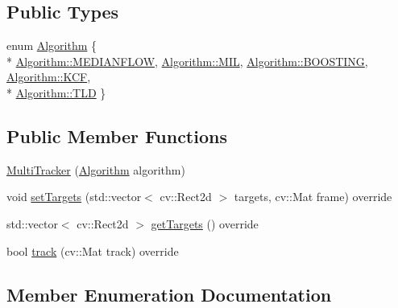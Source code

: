 \subsection*{Public Types}
\begin{DoxyCompactItemize}
\item 
enum \hyperlink{class_multi_tracker_ab6812f54aab6ae031431acf7f86e0ff9}{Algorithm} \{ \\*
\hyperlink{class_multi_tracker_ab6812f54aab6ae031431acf7f86e0ff9ab1ec37319ba2c8496771dbb23e8ed553}{Algorithm\+::\+M\+E\+D\+I\+A\+N\+F\+L\+OW}, 
\hyperlink{class_multi_tracker_ab6812f54aab6ae031431acf7f86e0ff9a8ef4ac08814f3de3bff92300d69f940a}{Algorithm\+::\+M\+IL}, 
\hyperlink{class_multi_tracker_ab6812f54aab6ae031431acf7f86e0ff9a701d1757588b2e8c1b007e488913a1cf}{Algorithm\+::\+B\+O\+O\+S\+T\+I\+NG}, 
\hyperlink{class_multi_tracker_ab6812f54aab6ae031431acf7f86e0ff9a8fe8ff13575bf765967b4091f866fb3b}{Algorithm\+::\+K\+CF}, 
\\*
\hyperlink{class_multi_tracker_ab6812f54aab6ae031431acf7f86e0ff9ac509b3bd238b50a1f6f9f3cfd6cc3d2b}{Algorithm\+::\+T\+LD}
 \}
\end{DoxyCompactItemize}
\subsection*{Public Member Functions}
\begin{DoxyCompactItemize}
\item 
\hyperlink{class_multi_tracker_a4387f9d863e08f10f8095cc34aaafaf2}{Multi\+Tracker} (\hyperlink{class_multi_tracker_ab6812f54aab6ae031431acf7f86e0ff9}{Algorithm} algorithm)
\item 
void \hyperlink{class_multi_tracker_a050ccd2cd1406aef5dfd1858a5ab8d29}{set\+Targets} (std\+::vector$<$ cv\+::\+Rect2d $>$ targets, cv\+::\+Mat frame) override
\item 
std\+::vector$<$ cv\+::\+Rect2d $>$ \hyperlink{class_multi_tracker_aca1ffe7d9943d9e726b5a0d6e4824c65}{get\+Targets} () override
\item 
bool \hyperlink{class_multi_tracker_a11dde58c6f6033a86e5abb84fc4b6ec6}{track} (cv\+::\+Mat track) override
\end{DoxyCompactItemize}


\subsection{Member Enumeration Documentation}
